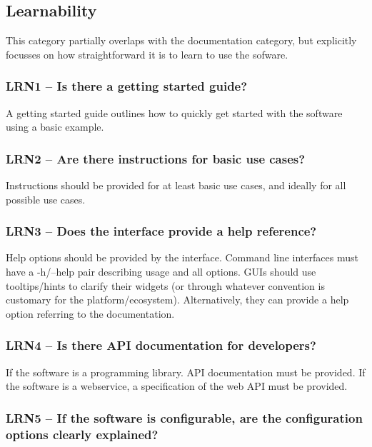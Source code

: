 \documentclass[a4paper,11pt]{article}
\begin{document}
\subsection{Learnability}

This category partially overlaps with the documentation category, but explicitly
focusses on how straightforward it is to learn to use the sofware.

\subsubsection{LRN1 -- Is there a getting started guide?}

A getting started guide outlines how to quickly get started with the software
using a basic example.

\subsubsection{LRN2 -- Are there instructions for basic use cases?}

Instructions should be provided for at least basic use cases, and ideally for
all possible use cases.

\subsubsection{LRN3 -- Does the interface provide a help reference?}

Help options should be provided by the interface. Command line interfaces must
have a -h/--help pair describing usage and all options. GUIs should use tooltips/hints to clarify
their widgets (or through whatever convention is customary for the
platform/ecosystem). Alternatively, they can provide a help option referring to
the documentation.

\subsubsection{LRN4 -- Is there API documentation for developers?}

If the software is a programming library. API documentation must be provided.
If the software is a webservice, a specification of the web API must be provided.

\subsubsection{LRN5 -- If the software is configurable, are the configuration
options clearly explained?}
\end{document}
